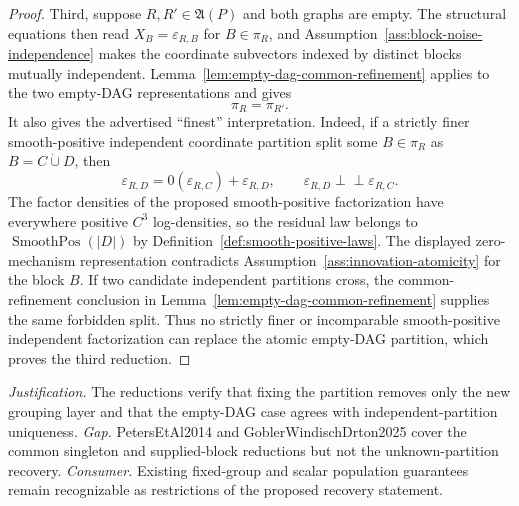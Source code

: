 \documentclass{article}
\begin{document}
\begin{proof}
Third, suppose \(R,R'\in\mathfrak A(P)\) and both graphs are empty.  The
structural equations then read \(X_B=\varepsilon_{R,B}\) for
\(B\in\pi_R\), and Assumption~\ref{ass:block-noise-independence} makes the
coordinate subvectors indexed by distinct blocks mutually independent.
Lemma~\ref{lem:empty-dag-common-refinement} applies to the two empty-DAG
representations and gives
\[
 \pi_R=\pi_{R'}.
\]
It also gives the advertised ``finest'' interpretation.  Indeed, if a
strictly finer smooth-positive independent coordinate partition split some
\(B\in\pi_R\) as \(B=C\mathbin{\dot\cup}D\), then
\[
 \varepsilon_{R,D}=0(\varepsilon_{R,C})+\varepsilon_{R,D},
 \qquad
 \varepsilon_{R,D}\perp\!\!\!\perp\varepsilon_{R,C}.
\]
The factor densities of the proposed smooth-positive factorization have
everywhere positive \(C^3\) log-densities, so the residual law belongs to
\(\operatorname{SmoothPos}(|D|)\) by
Definition~\ref{def:smooth-positive-laws}.  The displayed zero-mechanism
representation contradicts Assumption~\ref{ass:innovation-atomicity} for the
block \(B\).  If two candidate independent partitions cross, the
common-refinement conclusion in
Lemma~\ref{lem:empty-dag-common-refinement} supplies the same forbidden split.
Thus no strictly finer or incomparable smooth-positive independent
factorization can replace the atomic empty-DAG partition, which proves the
third reduction.
\end{proof}
\par\smallskip\noindent \textit{Justification.} The reductions verify that fixing the partition removes only the new grouping layer and that the empty-DAG case agrees with independent-partition uniqueness. \textit{Gap.} PetersEtAl2014 and GoblerWindischDrton2025 cover the common singleton and supplied-block reductions but not the unknown-partition recovery. \textit{Consumer.} Existing fixed-group and scalar population guarantees remain recognizable as restrictions of the proposed recovery statement.
\end{document}
